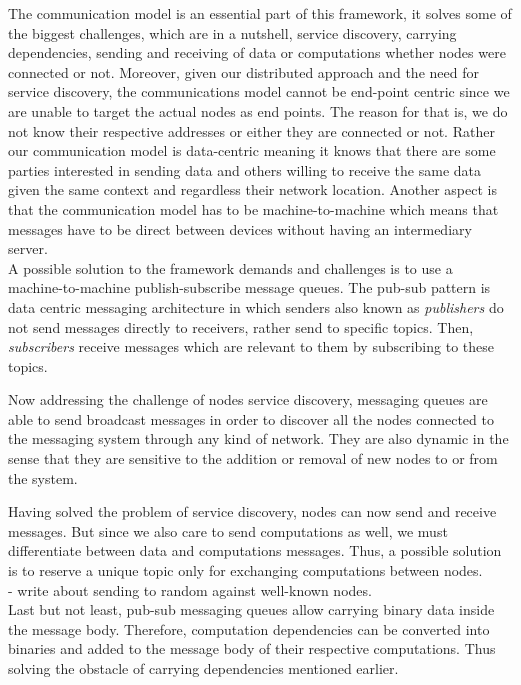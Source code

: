 The communication model is an essential part of this framework, it solves some of the biggest challenges, which are in a nutshell, service discovery, carrying dependencies, sending and receiving of data or computations whether nodes were  connected or not. Moreover, given our distributed approach and the need for service discovery, the communications model cannot be  end-point centric since we are unable to target the actual nodes as end points. The reason for that is, we do not know their respective addresses or either they are connected or not. Rather our communication model is data-centric meaning it knows that there are some parties interested in sending data and others willing to receive the same data given the same context and regardless their network location. Another aspect is that the communication model has to be machine-to-machine which means that messages have to be direct between devices without having an intermediary server. \\

A possible solution to the framework demands and challenges is to use a machine-to-machine publish-subscribe message queues. The pub-sub pattern is data centric messaging architecture in which senders also known as \textit{publishers} do not send messages directly to receivers, rather send to specific topics. Then, \textit{subscribers} receive messages which are relevant to them by subscribing to these topics. 

Now addressing the challenge of nodes service discovery, messaging queues are able to send broadcast messages in order to discover all the nodes connected to the messaging system through any kind of network.  They are also dynamic in the sense that they are sensitive to the addition or removal of new nodes to or from the system. 

Having solved the problem of service discovery, nodes can now send and receive messages. But since we also care to send computations as well, we must differentiate between data  and computations messages. Thus, a possible solution is to reserve a unique topic only for exchanging computations between nodes.
\\
- write about sending to random against well-known nodes.
\\
Last but not least, pub-sub messaging queues allow carrying binary data inside the message body. Therefore, computation dependencies can be converted into binaries and added to the message body of their respective computations. Thus solving the obstacle of carrying dependencies mentioned earlier.
\\


